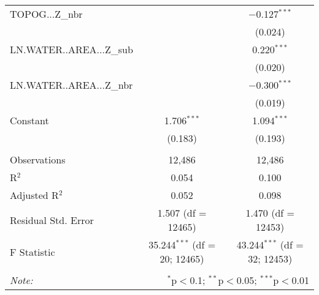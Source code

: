 \begin{table}[!htbp]
\begin{tabular}{@{\extracolsep{5pt}}lcc}
  TOPOG...Z\_nbr &  & $-$0.127$^{***}$ \\ 
  &  & (0.024) \\ 
  LN.WATER..AREA...Z\_sub &  & 0.220$^{***}$ \\ 
  &  & (0.020) \\ 
  LN.WATER..AREA...Z\_nbr &  & $-$0.300$^{***}$ \\ 
  &  & (0.019) \\ 
  Constant & 1.706$^{***}$ & 1.094$^{***}$ \\ 
  & (0.183) & (0.193) \\ 
 \hline \\[-1.8ex] 
Observations & 12,486 & 12,486 \\ 
R$^{2}$ & 0.054 & 0.100 \\ 
Adjusted R$^{2}$ & 0.052 & 0.098 \\ 
Residual Std. Error & 1.507 (df = 12465) & 1.470 (df = 12453) \\ 
F Statistic & 35.244$^{***}$ (df = 20; 12465) & 43.244$^{***}$ (df = 32; 12453) \\ 
\hline 
\hline \\[-1.8ex] 
\textit{Note:}  & \multicolumn{2}{r}{$^{*}$p$<$0.1; $^{**}$p$<$0.05; $^{***}$p$<$0.01} \\ 
\end{tabular} 
\end{table} 
